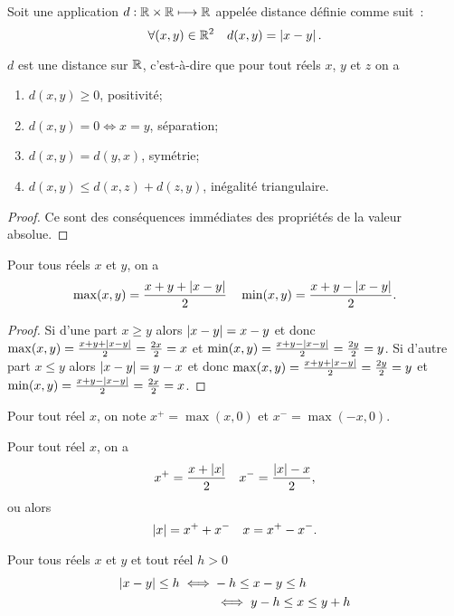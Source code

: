 \begin{defdef}
  Soit une application $d:\mathbb{R}\times\mathbb{R}\longmapsto \mathbb{R}$ appelée distance définie comme suit~:
  \begin{equation}
    \forall (x,y) \in \mathbb{R}^2 \quad d(x,y)=\left\lvert x-y\right\rvert.
  \end{equation}
\end{defdef}
\begin{prop}
  $d$ est une distance sur $\mathbb{R}$, c'est-à-dire que pour tout réels $x$, $y$ et $z$ on a
  \begin{enumerate}
  \item $d(x,y)\geq 0$, positivité;
  \item $d(x,y)=0 \iff x=y$, séparation;
  \item $d(x,y)=d(y,x)$, symétrie;
  \item $d(x,y)\leq d(x,z)+d(z,y)$, inégalité triangulaire.
  \end{enumerate}
\end{prop}
\begin{proof}
  Ce sont des conséquences immédiates des propriétés de la valeur absolue.
\end{proof}
\begin{prop}
  Pour tous réels $x$ et $y$, on a
  \begin{equation}
    \max(x,y)=\frac{x+y+\left\lvert x-y\right\rvert}{2} \quad \min(x,y)=\frac{x+y-\left\lvert x-y\right\rvert}{2}.
  \end{equation}
\end{prop}
\begin{proof}
  Si d'une part $x\geq y$ alors $\left\lvert x-y\right\rvert=x-y$ et donc $\max(x,y)=\frac{x+y+\left\lvert x-y\right\rvert}{2}=\frac{2x}{2}=x$ et $\min(x,y)=\frac{x+y-\left\lvert x-y\right\rvert}{2}=\frac{2y}{2}=y$. Si d'autre part $x\leq y$ alors $\left\lvert x-y\right\rvert=y-x$ et donc $\max(x,y)=\frac{x+y+\left\lvert x-y\right\rvert}{2}=\frac{2y}{2}=y$ et $\min(x,y)=\frac{x+y-\left\lvert x-y\right\rvert}{2}=\frac{2x}{2}=x$.
\end{proof}
\begin{defdef}
  Pour tout réel $x$, on note $x^+=\max(x,0)$ et $x^-=\max(-x,0)$.
\end{defdef}
\begin{prop}
  Pour tout réel $x$, on a
  \begin{equation}
    x^+=\frac{x+\left\lvert x\right\rvert}{2} \quad x^-=\frac{\left\lvert x\right\rvert-x}{2},
  \end{equation}
  ou alors
  \begin{equation}
    \left\lvert x\right\rvert=x^++x^- \quad x=x^+-x^-.
  \end{equation}
\end{prop}
\begin{prop}
  Pour tous réels $x$ et $y$ et tout réel $h>0$
  \begin{align}
    \left\lvert x-y\right\rvert\leq h \iff & -h \leq x-y \leq h\\
    &\iff y-h \leq x \leq y+h
  \end{align}
\end{prop}
